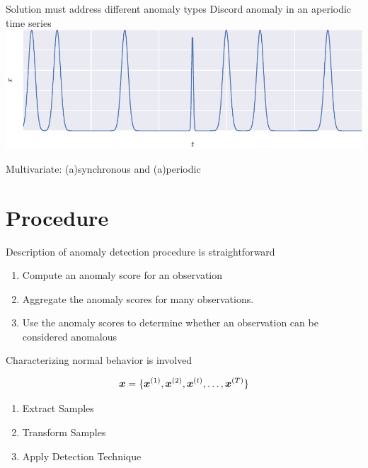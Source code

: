 \documentclass{beamer}
\begin{document}
\begin{frame}[allowframebreaks]{Solution must address different anomaly types}
    \framebreak
    Discord anomaly in an aperiodic time series
    \centering
    \includegraphics[width=\textwidth]{figs/discord_aper.pdf}

    \framebreak
    \centering
    Multivariate: (a)synchronous and (a)periodic

  \end{frame}


  \section{Procedure}

  \begin{frame}{Description of anomaly detection procedure is straightforward}

    \begin{enumerate}
    \item Compute an anomaly score for an observation
    \item Aggregate the anomaly scores for many observations.
    \item Use the anomaly scores to determine whether an observation can be considered anomalous
    \end{enumerate}

  \end{frame}

  \begin{frame}{Characterizing normal behavior is involved}
    
    \begin{equation*}
    \boldsymbol{x}=\{\boldsymbol{x}\sp{(1)},\boldsymbol{x}\sp{(2)},\boldsymbol{x}\sp{(t)},\ldots,\boldsymbol{x}\sp{(T)}\}
    \end{equation*}

    \begin{enumerate}
    \item Extract Samples
    \item Transform Samples
    \item Apply Detection Technique
    \end{enumerate}

  \end{frame}
\end{document}
